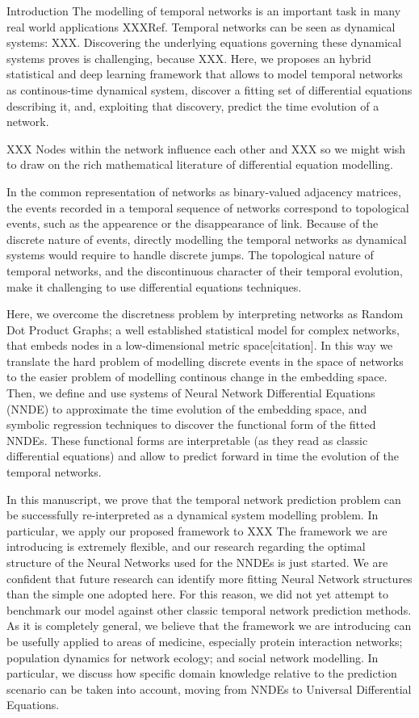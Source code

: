 \documentclass{article}
\begin{document}
\begin{section}{Introduction}
The modelling of temporal networks is an important task in many real world applications XXXRef.
Temporal networks can be seen as dynamical systems: XXX.
Discovering the underlying equations governing these dynamical systems proves is challenging, because XXX.
Here, we proposes an hybrid statistical and deep learning framework that allows to model temporal networks as continous-time dynamical system, discover a fitting set of differential equations describing it, and, exploiting that discovery, predict the time evolution of a network.

XXX Nodes within the network influence each other and XXX so we might wish to draw on the rich mathematical literature of differential equation modelling.

In the common representation of networks as binary-valued adjacency matrices, the events recorded in a temporal sequence of networks correspond to topological events, such as the appearence or the disappearance of link.
Because of the discrete nature of events, directly modelling the temporal networks as dynamical systems would require to handle discrete jumps.
The topological nature of temporal networks, and the discontinuous character of their temporal evolution, make it challenging to use differential equations techniques.

Here, we overcome the discretness problem by interpreting networks as Random Dot Product Graphs; a well established statistical model for complex networks, that embeds nodes in a low-dimensional metric space[citation]. In this way we translate the hard problem of modelling discrete events in the space of networks to the easier problem of modelling continous change in the embedding space. Then, we define and use systems of Neural Network Differential Equations (NNDE) to approximate the time evolution of the embedding space, and symbolic regression techniques to discover the functional form of the fitted NNDEs. These functional forms are interpretable (as they read as classic differential equations) and allow to predict forward in time the evolution of the temporal networks.

In this manuscript, we prove that the temporal network prediction problem can be successfully re-interpreted as a dynamical system modelling problem. In particular, we apply our proposed framework to XXX
The framework we are introducing is extremely flexible, and our research regarding the optimal structure of the Neural Networks used for the NNDEs is just started.
We are confident that future research can identify more fitting Neural Network structures than the simple one adopted here.
For this reason, we did not yet attempt to benchmark our model against other classic temporal network prediction methods.
As it is completely general, we believe that the framework we are introducing can be usefully applied to areas of medicine, especially protein interaction networks; population dynamics for network ecology; and social network modelling. In particular, we discuss how specific domain knowledge relative to the prediction scenario can be taken into account, moving from NNDEs to Universal Differential Equations.


\end{section}
\end{document}
